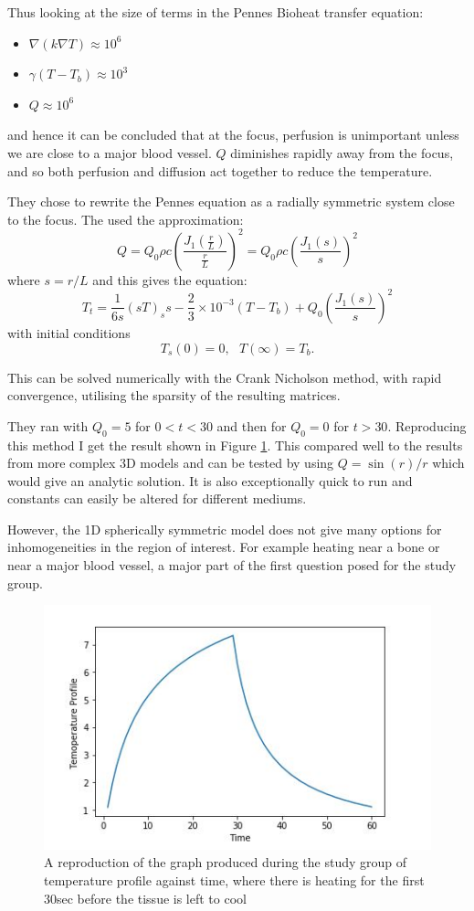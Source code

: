 \documentclass[11pt]{article} %
\begin{document}
 	Thus looking at the size of terms in the Pennes Bioheat transfer equation:
 	\begin{itemize}
 		\item $\nabla (k\nabla T) \approx 10^6$
 		\item $ \gamma (T-T_b) \approx 10^3$
 		\item $ Q \approx 10^6$
 	\end{itemize}
 and hence it can be concluded that at the focus, perfusion is unimportant unless we are close to a major blood vessel.  $ Q $ diminishes rapidly away from the focus, and so both perfusion and diffusion act together to reduce the temperature. 
 
 They chose to rewrite the Pennes equation as a radially symmetric system close to the focus. The used the approximation: 
 \begin{equation}
 Q=Q_0 \rho c \left(\frac{J_1\left(\frac{r}{L}\right)}{\frac{r}{L}}\right)^2= Q_0\rho c \left(\frac{J_1(s)}{s}\right)^2
 \end{equation}
 where $s=r/L$ and this gives the equation:
 \begin{equation}
 T_t=\frac{1}{6s}(sT)_ss-\frac{2}{3}\times 10^{-3}(T-T_b)+Q_0 \left(\frac{J_1(s)}{s}\right)^2
 \end{equation}
 with initial conditions $$ T_s(0)=0 , \ \ \ T(\infty)=T_b .$$
 
 This can be solved numerically with the Crank Nicholson method, with rapid convergence,  utilising the sparsity of the resulting matrices. 
 
 They ran with $Q_0=5$ for $0<t<30$ and then for $Q_0=0$ for $t>30$. Reproducing this method I get the result shown in Figure   \ref{fig:studygroupcode}. This compared well to the results from more complex 3D models and can be tested by using $ Q=\sin(r)/r $ which would give an analytic solution. It is also exceptionally quick to run and constants can easily be altered for different mediums. 
 
 However, the 1D spherically symmetric model does not give many options for inhomogeneities in the region of interest. For example heating near a bone or near a major blood vessel, a major part of the first question posed for the study group.
 \begin{figure}
 	\centering
 	\includegraphics[width=0.7\linewidth]{Report_images/studygroupcode}
 	\caption{A reproduction of the graph produced during the study group of temperature profile against time, where there is heating for the first 30sec before the tissue is left to cool}
 	\label{fig:studygroupcode}
 \end{figure}
\end{document}
